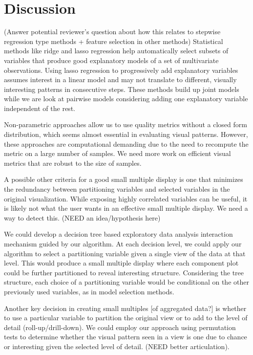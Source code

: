 \section{Discussion}
\label{sec:discussion}
(Answer potential reviewer's question about how this relates to stepwise regression type methods + feature selection in other methods)
Statistical methods like ridge and lasso regression help automatically select subsets of variables that produce good explanatory models of a set of multivariate observations. Using lasso regression to progressively add explanatory variables assumes interest in a linear model and may not translate to different, visually interesting  patterns in consecutive steps. These methods build up joint models while we are look at pairwise models considering adding one explanatory variable independent of the rest. 

Non-parametric approaches allow us to use quality metrics without a closed form distribution, which seems almost essential in evaluating visual patterns. However, these approaches are computational demanding due to the need to recompute the metric on a large number of samples. We need more work on efficient visual metrics that are robust to the size of samples.

A possible other criteria for a good small multiple display is one that minimizes the redundancy between partitioning variables and selected variables in the original visualization. While exposing highly correlated variables can be useful, it is likely not what the user wants in an effective small multiple display. We need a way to detect this. (NEED an idea/hypothesis here)

We could develop a decision tree based exploratory data analysis interaction mechanism guided by our algorithm. At each decision level, we could apply our algorithm to select a partitioning variable given a single view of the data at that level. This would produce a small multiple display where each component plot could be further partitioned to reveal interesting structure. Considering the tree structure, each choice of a partitioning variable would be conditional on the other previously used variables, as in model selection methods. 

Another key decision in creating small multiples [of aggregated data?] is whether to use a particular variable to partition the original view or to add to the level of detail (roll-up/drill-down). We could employ our approach using permutation tests  to determine whether the visual pattern seen in a view is one due to chance or interesting given the selected level of detail. (NEED better articulation).


